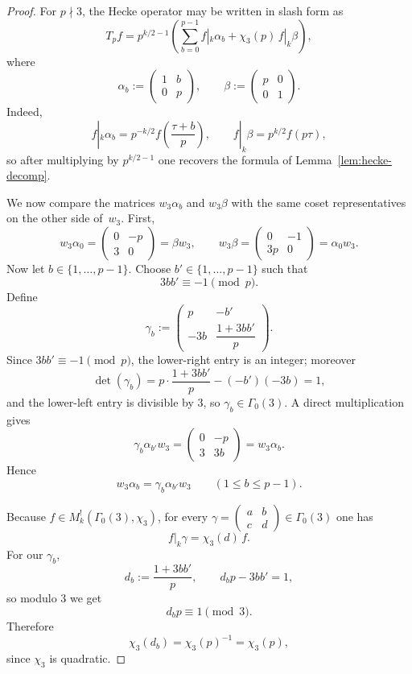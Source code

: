 \documentclass[11pt]{amsart}
\theoremstyle{remark}
\begin{document}
\begin{proof}
For $p\nmid3$, the Hecke operator may be written in slash form as
\[
T_pf
=
p^{k/2-1}\left(
\sum_{b=0}^{p-1}f|_k\alpha_b
+\chi_3(p)\,f|_k\beta
\right),
\]
where
\[
\alpha_b:=\begin{pmatrix}1&b\\ 0&p\end{pmatrix},
\qquad
\beta:=\begin{pmatrix}p&0\\ 0&1\end{pmatrix}.
\]
Indeed,
\[
f|_k\alpha_b=p^{-k/2}f\!\left(\frac{\tau+b}{p}\right),
\qquad
f|_k\beta=p^{k/2}f(p\tau),
\]
so after multiplying by $p^{k/2-1}$ one recovers the formula of Lemma~\ref{lem:hecke-decomp}.

We now compare the matrices $w_3\alpha_b$ and $w_3\beta$ with the same coset representatives on the other
side of~$w_3$. First,
\[
w_3\alpha_0
=\begin{pmatrix}0&-p\\ 3&0\end{pmatrix}
=\beta w_3,
\qquad
w_3\beta
=\begin{pmatrix}0&-1\\ 3p&0\end{pmatrix}
=\alpha_0 w_3.
\]
Now let $b\in\{1,\dots,p-1\}$. Choose $b'\in\{1,\dots,p-1\}$ such that
\[
3bb'\equiv -1 \pmod p.
\]
Define
\[
\gamma_b:=
\begin{pmatrix}
p & -b'\\
-3b & \dfrac{1+3bb'}{p}
\end{pmatrix}.
\]
Since $3bb'\equiv-1\pmod p$, the lower-right entry is an integer; moreover
\[
\det(\gamma_b)
=
p\cdot\frac{1+3bb'}{p}-(-b')(-3b)
=
1,
\]
and the lower-left entry is divisible by $3$, so $\gamma_b\in\Gamma_0(3)$. A direct multiplication gives
\[
\gamma_b\alpha_{b'}w_3
=
\begin{pmatrix}0&-p\\ 3&3b\end{pmatrix}
=
w_3\alpha_b.
\]
Hence
\[
w_3\alpha_b=\gamma_b\alpha_{b'}w_3
\qquad (1\le b\le p-1).
\]

Because $f\in M_k^!(\Gamma_0(3),\chi_3)$, for every
$\gamma=\begin{pmatrix}a&b\\ c&d\end{pmatrix}\in\Gamma_0(3)$ one has
\[
f|_k\gamma=\chi_3(d)\,f.
\]
For our $\gamma_b$,
\[
d_b:=\frac{1+3bb'}{p},
\qquad
d_bp-3bb'=1,
\]
so modulo $3$ we get
\[
d_bp\equiv1\pmod3.
\]
Therefore
\[
\chi_3(d_b)=\chi_3(p)^{-1}=\chi_3(p),
\]
since $\chi_3$ is quadratic.


\end{proof}
\end{document}
